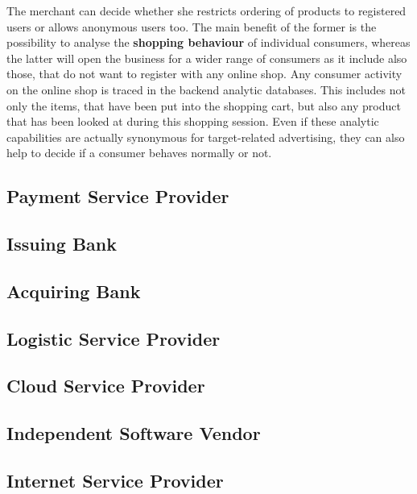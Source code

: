 The merchant can decide whether she restricts ordering of products to registered users or allows anonymous users too. The main benefit of the former is the possibility to analyse the \textbf{shopping behaviour} of individual consumers, whereas the latter will open the business for a wider range of consumers as it include also those, that do not want to register with any online shop. Any consumer activity on the online shop is traced in the backend analytic databases. This includes not only the items, that have been put into the shopping cart, but also any product that has been looked at during this shopping session. Even if these analytic capabilities are actually synonymous for target-related advertising, they can also help to decide if a consumer behaves normally or not. \\



\subsection{Payment Service Provider}
\label{subsec:stakeholder_psp}


\subsection{Issuing Bank}
\label{subsec:stakeholder_issuer}


\subsection{Acquiring Bank}
\label{subsec:stakeholder_acquirer}


\subsection{Logistic Service Provider}
\label{subsec:stakeholder_lsp}


\subsection{Cloud Service Provider}
\label{subsec:stakeholder_csp}


\subsection{Independent Software Vendor}
\label{subsec:stakeholder_isv}


\subsection{Internet Service Provider}
\label{subsec:stakeholder_isp}


